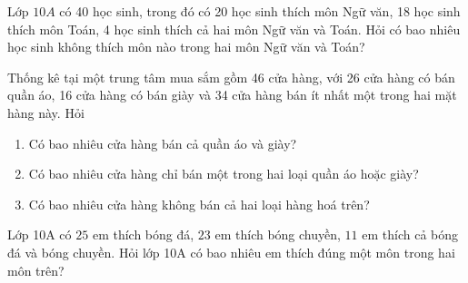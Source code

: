 \begin{bt}%
	Lớp $10 A$ có 40 học sinh, trong đó có 20 học sinh thích môn Ngữ văn, 18 học sinh thích môn Toán, 4 học sinh thích cả hai môn Ngữ văn và Toán. Hỏi có bao nhiêu học sinh không thích môn nào trong hai môn Ngữ văn và Toán?
\end{bt}

\begin{bt}%
	Thống kê tại một trung tâm mua sắm gồm 46 cửa hàng, với 26 cửa hàng có bán quần áo, 16 cửa hàng có bán giày và 34 cửa hàng bán ít nhất một trong hai mặt hàng này. Hỏi
	\begin{enumerate}
		\item 	Có bao nhiêu cửa hàng bán cả quần áo và giày?
		\item 	Có bao nhiêu cửa hàng chỉ bán một trong hai loại quần áo hoặc giày?
		\item 	Có bao nhiêu cửa hàng không bán cả hai loại hàng hoá trên?
	\end{enumerate}
\end{bt}

\begin{bt}%
	Lớp 10A có $25$ em thích bóng đá, $23$ em thích bóng chuyền, $11$ em thích cả bóng đá và bóng chuyền. Hỏi lớp 10A có bao nhiêu em thích đúng một môn trong hai môn trên?
\end{bt}

